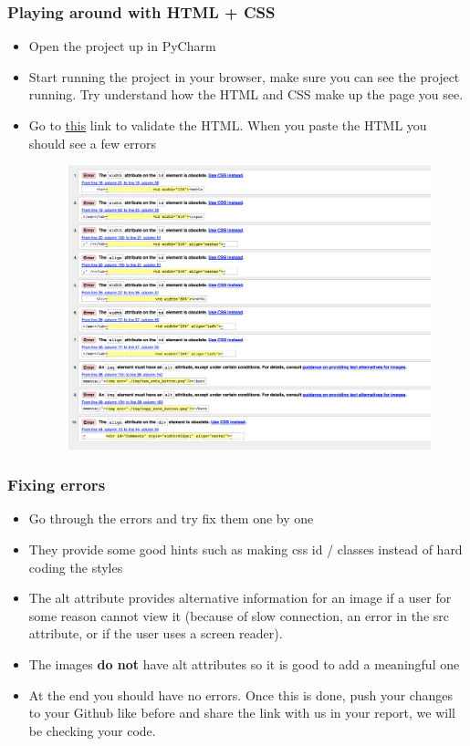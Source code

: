 \documentclass{beamer}
\begin{document}
\begin{frame}
  \frametitle{Playing around with HTML + CSS}
  \begin{itemize}
  	\item Open the project up in PyCharm
  	\item Start running the project in your browser, make sure you can see the project running. Try understand how the HTML and CSS make up the page you see.
  	\item Go to \href{https://bit.ly/31EWDEs}{this} link to validate the HTML. When you paste the HTML you should see a few errors 
  	\begin{figure}
  	\includegraphics[scale=0.1]{./errors}
	\end{figure}
 \end{itemize}
\end{frame}


\begin{frame}
  \frametitle{Fixing errors}
  \begin{itemize}
  	\item Go through the errors and try fix them one by one
  	\item They provide some good hints such as making css id / classes instead of hard coding the styles
  	\item The alt attribute provides alternative information for an image if a user for some reason cannot view it (because of slow connection, an error in the src attribute, or if the user uses a screen reader).
  	\item The images \textbf{do not} have alt attributes so it is good to add a meaningful one
  	\item At the end you should have no errors. Once this is done, push your changes to your Github like before and share the link with us in your report, we will be checking your code.
 \end{itemize}
\end{frame}
\end{document}
